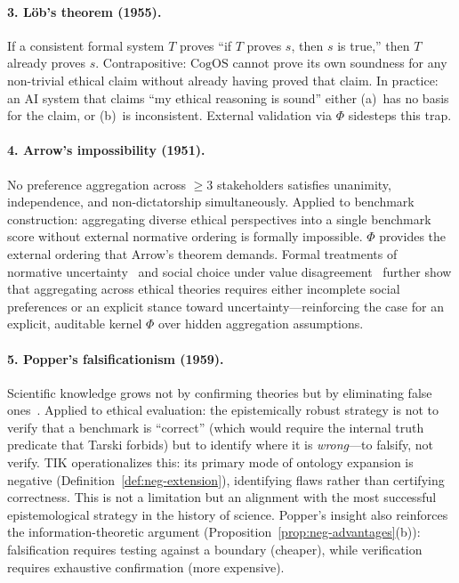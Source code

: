 \documentclass[11pt]{article}
\newcommand{\CogOS}{\text{CogOS}}
\begin{document}
\paragraph{3. L\"{o}b's theorem (1955).}
If a consistent formal system $T$ proves ``if $T$ proves $s$, then $s$ is
true,'' then $T$ already proves $s$. Contrapositive: $\CogOS$ cannot prove
its own soundness for any non-trivial ethical claim without already having
proved that claim. In practice: an AI system that claims ``my ethical
reasoning is sound'' either (a)~has no basis for the claim, or (b)~is
inconsistent. External validation via $\Phi$ sidesteps this trap.

\paragraph{4. Arrow's impossibility (1951).}
No preference aggregation across $\geq 3$ stakeholders satisfies unanimity,
independence, and non-dictatorship simultaneously. Applied to benchmark
construction: aggregating diverse ethical perspectives into a single benchmark
score without external normative ordering is formally impossible. $\Phi$
provides the external ordering that Arrow's theorem demands. Formal treatments of normative uncertainty~\citep{macaskill2020moral} and social choice under value disagreement~\citep{dietrich2018moral} further show that aggregating across ethical theories requires either incomplete social preferences or an explicit stance toward uncertainty---reinforcing the case for an explicit, auditable kernel $\Phi$ over hidden aggregation assumptions.

\paragraph{5. Popper's falsificationism (1959).}
Scientific knowledge grows not by confirming theories but by eliminating false
ones~\citep{popper1959}. Applied to ethical evaluation: the epistemically
robust strategy is not to verify that a benchmark is ``correct'' (which would
require the internal truth predicate that Tarski forbids) but to identify
where it is \textit{wrong}---to falsify, not verify. TIK operationalizes
this: its primary mode of ontology expansion is negative
(Definition~\ref{def:neg-extension}), identifying flaws rather than certifying
correctness. This is not a limitation but an alignment with the most
successful epistemological strategy in the history of science. Popper's
insight also reinforces the information-theoretic argument
(Proposition~\ref{prop:neg-advantages}(b)): falsification requires testing
against a boundary (cheaper), while verification requires exhaustive
confirmation (more expensive).
\end{document}
